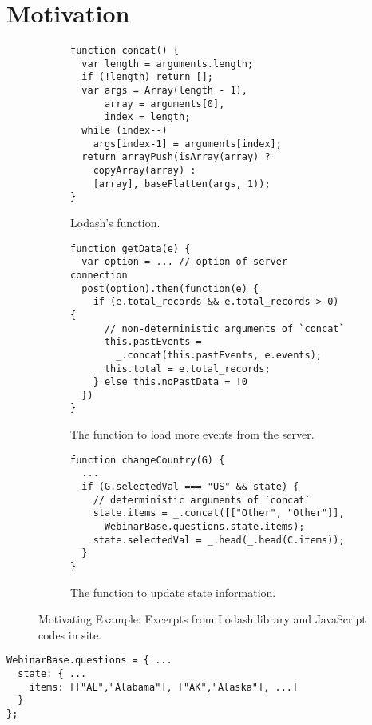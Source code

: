 \section{Motivation}\label{sec:motivation}

\begin{figure}[t]
  \centering
  \begin{subfigure}[t]{0.5\textwidth}
    \begin{lstlisting}[style=myJSstyle]
function concat() {
  var length = arguments.length;
  if (!length) return [];
  var args = Array(length - 1),
      array = arguments[0],
      index = length;
  while (index--)
    args[index-1] = arguments[index];
  return arrayPush(isArray(array) ?
    copyArray(array) :
    [array], baseFlatten(args, 1));
}
    \end{lstlisting}
    \label{fig:example-concat}
    \vspace*{-1em}
    \caption{Lodash's  function.}
  \end{subfigure}
  \begin{subfigure}[t]{0.5\textwidth}
    \begin{lstlisting}[style=myJSstyle,firstnumber=13]
function getData(e) {
  var option = ... // option of server connection
  post(option).then(function(e) {
    if (e.total_records && e.total_records > 0) {
      // non-deterministic arguments of `concat`
      this.pastEvents =
        _.concat(this.pastEvents, e.events);
      this.total = e.total_records;
    } else this.noPastData = !0
  })
}
    \end{lstlisting}
    \label{fig:example-concat}
    \vspace*{-1em}
    \caption{The  function to load more events from the server.}
  \end{subfigure}
  \begin{subfigure}[t]{0.5\textwidth}
    \begin{lstlisting}[style=myJSstyle,firstnumber=24]
function changeCountry(G) {
  ...
  if (G.selectedVal === "US" && state) {
    // deterministic arguments of `concat`
    state.items = _.concat([["Other", "Other"]],
      WebinarBase.questions.state.items);
    state.selectedVal = _.head(_.head(C.items));
  }
}
    \end{lstlisting}
    \label{fig:example-concat}
    \vspace*{-1em}
    \caption{The  function to update state information.}
  \end{subfigure}
  \label{fig:example}
  \vspace*{-1em}
  \caption{Motivating Example: Excerpts from Lodash library and JavaScript codes
  in  site.}
\end{figure}

\begin{lstlisting}[style=myJSstyle]
WebinarBase.questions = { ...
  state: { ...
    items: [["AL","Alabama"], ["AK","Alaska"], ...]
  }
};
\end{lstlisting}

\todo

